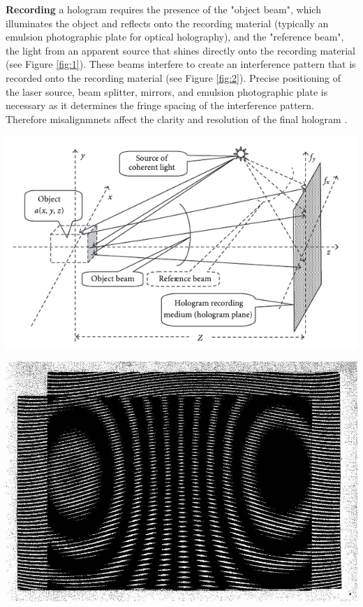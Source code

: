 \documentclass[12pt]{article}
\begin{document}
\textbf{Recording} a hologram requires the presence of the "object beam", which illuminates the object and reflects onto the recording material (typically an emulsion photographic plate for optical holography), and the
"reference beam", the light from an apparent source that shines directly onto the recording material
\cite{UCDholo,basicholo1} (see Figure \ref{fig:1}).
These beams interfere to create an interference pattern that is recorded onto the recording material (see Figure \ref{fig:2}). Precise positioning of the laser source, beam splitter, mirrors, and emulsion photographic plate is necessary as it determines the
fringe spacing of the interference pattern. Therefore misalignmnets affect the clarity and resolution of the final hologram
\cite{UCDholo,collier2013optical}.

\begin{minipage}{.49\textwidth}
    \captionsetup{hypcap=false}
    \centering
    \includegraphics[width=\linewidth]{hologram construction.png}
    \label{fig:1}
\end{minipage}
\hfill
\begin{minipage}{.49\textwidth}
    \captionsetup{hypcap=false}
    \centering
    \includegraphics[width=\linewidth]{holo interference.jpg}
    \label{fig:2}
\end{minipage}
\end{document}
